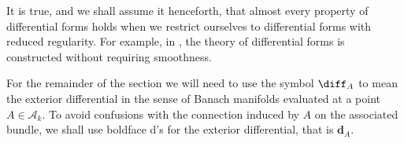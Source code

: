 \begin{obs}
    It is true, and we shall assume it henceforth, that almost every property of differential forms holds when we restrict ourselves to differential forms with reduced regularity. For example, in \parencite{SergeLang}, the theory of differential forms is constructed without requiring smoothness.
\end{obs}

For the remainder of the section we will need to use the symbol \(\diff_A\) to mean the exterior differential in the sense of Banach manifolds evaluated at a point \(A \in \mathscr{A}_k\). To avoid confusions with the connection induced by \(A\) on the associated bundle, we shall use boldface d's for the exterior differential, that is \(\mathbf{d}_A\).

